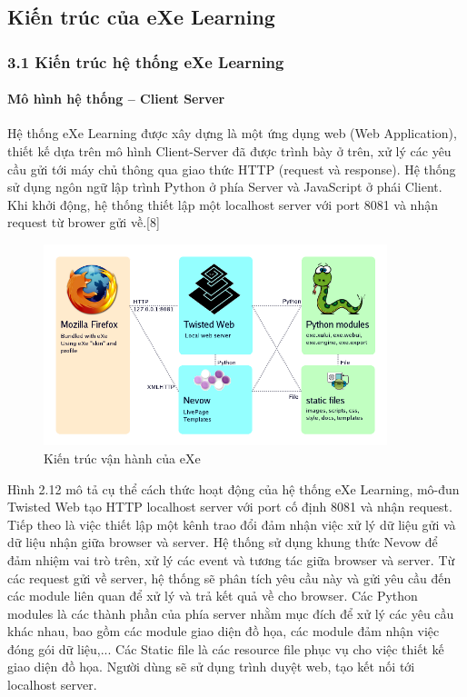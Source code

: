 \subsection{Kiến trúc của eXe Learning}
\subsubsection{3.1 Kiến trúc hệ thống eXe Learning}

\paragraph{Mô hình hệ thống – Client Server\\}

Hệ thống eXe Learning được xây dựng là một ứng dụng web (Web Application), thiết kế dựa trên mô hình Client-Server đã được trình bày ở trên, xử lý các yêu cầu gửi tới máy chủ thông qua giao thức HTTP (request và response). Hệ thống sử dụng ngôn ngữ lập trình Python ở phía Server và JavaScript ở phái Client. Khi khởi động, hệ thống thiết lập một localhost server với port 8081 và nhận request từ brower gửi về.[8]

\begin{center}
	\begin{figure}[htp]
		\begin{center}
			\includegraphics[width=10cm]{Chapter2/Pictures/picture212.png}
		\end{center}
		\caption{Kiến trúc vận hành của eXe}
		\label{refpicture212}
	\end{figure}
\end{center}

Hình 2.12 mô tả cụ thể cách thức hoạt động của hệ thống eXe Learning, mô-đun Twisted Web tạo HTTP localhost server với port cố định 8081 và nhận request. Tiếp theo là việc thiết lập một kênh trao đổi đảm nhận việc xử lý dữ liệu gửi và dữ liệu nhận giữa browser và server. Hệ thống sử dụng khung thức Nevow để đảm nhiệm vai trò trên, xử lý các event và tương tác giữa browser và server. Từ các request gửi về server, hệ thống sẽ phân tích yêu cầu này và gửi yêu cầu đến các module liên quan để xử lý và trả kết quả về cho browser. Các Python modules là các thành phần của phía server nhằm mục đích để xử lý các yêu cầu khác nhau, bao gồm các module giao diện đồ họa, các module đảm nhận việc đóng gói dữ liệu,... Các Static file là các resource file phục vụ cho việc thiết kế giao diện đồ họa. Người dùng sẽ sử dụng trình duyệt web, tạo kết nối tới localhost server.

